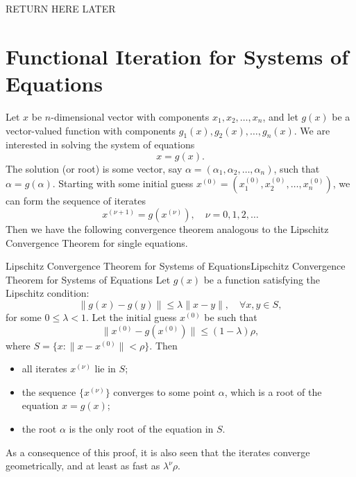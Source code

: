 \documentclass[../main.tex]{subfiles}
\begin{document}
RETURN HERE LATER

\section{Functional Iteration for Systems of Equations}
Let $x$ be $n$-dimensional vector with components $x_1, x_2, \dots, x_n$, and let $g(x)$ be a vector-valued function with components $g_1(x), g_2(x), \dots, g_n(x)$. We are interested in solving the system of equations
\begin{equation}
	x = g(x).
\end{equation}
The solution (or root) is some vector, say $\alpha = (\alpha_1, \alpha_2, \dots, \alpha_n)$, such that $\alpha = g(\alpha)$. Starting with some initial guess $x^{(0)} = (x_1^{(0)}, x_2^{(0)}, \dots, x_n^{(0)})$, we can form the sequence of iterates
\begin{equation*}
	x^{(\nu+1)} = g(x^{(\nu)}), \quad \nu = 0, 1, 2, \ldots
\end{equation*}
Then we have the following convergence theorem analogous to the Lipschitz Convergence Theorem for single equations.

\begin{theorem}{Lipschitz Convergence Theorem for Systems of Equations}{Lipschitz Convergence Theorem for Systems of Equations}
	Let $g(x)$ be a function satisfying the Lipschitz condition:
	\begin{equation*}
		\| g(x) - g(y) \| \leq \lambda \| x - y \|, \quad \forall x, y \in S,
	\end{equation*}
	for some $0 \leq \lambda < 1$. Let the initial guess $x^{(0)}$ be such that
	\begin{equation*}
		\| x^{(0)} - g(x^{(0)}) \| \leq (1 - \lambda) \rho,
	\end{equation*}
	where $S = \{ x : \| x - x^{(0)} \| < \rho\}$. Then
	\begin{itemize}
		\item all iterates $x^{(\nu)}$ lie in $S$;
		\item the sequence $\{x^{(\nu)}\}$ converges to some point $\alpha$, which is a root of the equation $x = g(x)$;
		\item the root $\alpha$ is the only root of the equation in $S$.
	\end{itemize}
\end{theorem}
As a consequence of this proof, it is also seen that the iterates converge geometrically, and at least as fast as $\lambda^\nu \rho$.
\end{document}
